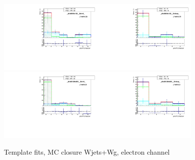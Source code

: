 \begin{figure}[htb]
\begin{center}
   \includegraphics[width=0.45\textwidth]{../figs/figs_v11/ELECTRON_WGamma/MCclosureWjetsPlusWg/c_TEMPL_CHISO_UNblind__phoEt95to120__Barrel__RooFit_MCclosure.pdf}\includegraphics[width=0.45\textwidth]{../figs/figs_v11/ELECTRON_WGamma/MCclosureWjetsPlusWg/c_TEMPL_CHISO_UNblind__phoEt95to120__Endcap__RooFit_MCclosure.pdf}\\
   \includegraphics[width=0.45\textwidth]{../figs/figs_v11/ELECTRON_WGamma/MCclosureWjetsPlusWg/c_TEMPL_CHISO_UNblind__phoEt120to500__Barrel__RooFit_MCclosure.pdf}\includegraphics[width=0.45\textwidth]{../figs/figs_v11/ELECTRON_WGamma/MCclosureWjetsPlusWg/c_TEMPL_CHISO_UNblind__phoEt120to500__Endcap__RooFit_MCclosure.pdf}\\
  \label{fig:templateFits_MCclosureWjetsPlusWg_CHISO_ELECTRON_3}
  \caption{Template fits, MC closure Wjets+Wg, electron channel}
  \end{center}
\end{figure}

